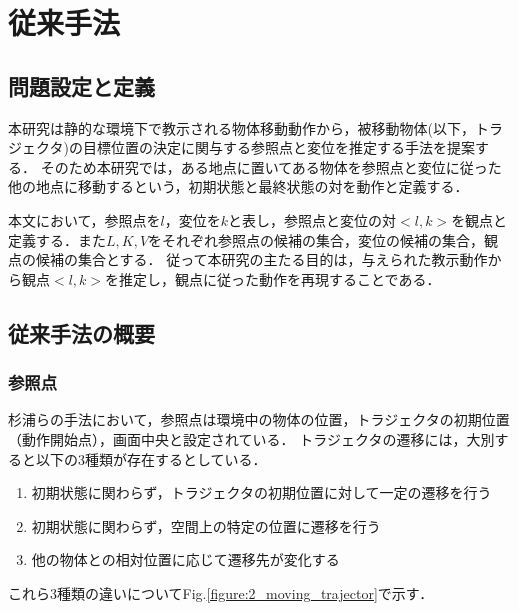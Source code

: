 ﻿%
\chapter{従来手法}

\section{問題設定と定義}

本研究は静的な環境下で教示される物体移動動作から，被移動物体(以下，トラジェクタ)の目標位置の決定に関与する参照点と変位を推定する手法を提案する．
そのため本研究では，ある地点に置いてある物体を参照点と変位に従った他の地点に移動するという，初期状態と最終状態の対を動作と定義する．

本文において，参照点を$l$，変位を$k$と表し，参照点と変位の対$<l , k>$を観点と定義する．また$L , K , V$をそれぞれ参照点の候補の集合，変位の候補の集合，観点の候補の集合とする．
従って本研究の主たる目的は，与えられた教示動作から観点$<l , k>$を推定し，観点に従った動作を再現することである．

\section{従来手法の概要}

\subsection{参照点}

杉浦ら\cite{sugiura}の手法において，参照点は環境中の物体の位置，トラジェクタの初期位置（動作開始点），画面中央と設定されている．
トラジェクタの遷移には，大別すると以下の3種類が存在するとしている．

	\begin{enumerate}
		\item 初期状態に関わらず，トラジェクタの初期位置に対して一定の遷移を行う
		\item 初期状態に関わらず，空間上の特定の位置に遷移を行う
		\item 他の物体との相対位置に応じて遷移先が変化する
	\end{enumerate}
これら3種類の違いについてFig.\ref{figure:2_moving_trajector}で示す．

